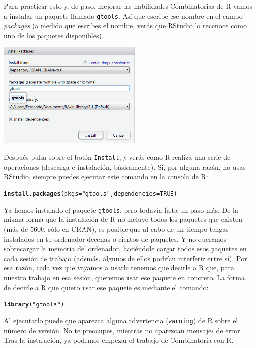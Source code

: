 \documentclass[10pt,a4paper]{article}\usepackage[]{graphicx}\usepackage[]{color}
\makeatletter
\newcommand{\hlnum}[1]{\textcolor[rgb]{0.686,0.059,0.569}{#1}}%
\newcommand{\hlstr}[1]{\textcolor[rgb]{0.192,0.494,0.8}{#1}}%
\newcommand{\hlstd}[1]{\textcolor[rgb]{0.345,0.345,0.345}{#1}}%
\newcommand{\hlkwc}[1]{\textcolor[rgb]{0.333,0.667,0.333}{#1}}%
\newcommand{\hlkwd}[1]{\textcolor[rgb]{0.737,0.353,0.396}{\textbf{#1}}}%
\newenvironment{kframe}{%
 \def\at@end@of@kframe{}%
 \ifinner\ifhmode%
  \def\at@end@of@kframe{\end{minipage}}%
  \begin{minipage}{\columnwidth}%
 \fi\fi%
 \def\FrameCommand##1{\hskip\@totalleftmargin \hskip-\fboxsep
 \colorbox{shadecolor}{##1}\hskip-\fboxsep
     \hskip-\linewidth \hskip-\@totalleftmargin \hskip\columnwidth}%
 \MakeFramed {\advance\hsize-\width
   \@totalleftmargin\z@ \linewidth\hsize
   \@setminipage}}%
 {\par\unskip\endMakeFramed%
 \at@end@of@kframe}
\newenvironment{knitrout}{}{} %
\makeatother
\begin{document}
      Para practicar esto y, de paso, mejorar las habilidades Combinatorias de R vamos a instalar un paquete llamado {\tt gtools}. Así que escribe ese nombre en el campo {\em packages} (a medida que escribes el nombre, verás que RStudio lo reconoce como uno de los  paquetes disponibles).
      \begin{center}
      \includegraphics[width=7cm]{./fig/Tut03-InstalarGtools2.png}
      \end{center}
      Después pulsa sobre el botón {\tt Install}, y verás como R realiza una serie de operaciones (descarga e instalación, básicamente). Si, por alguna razón, no usas RStudio, siempre puedes ejecutar este comando en la consola de R:
\begin{knitrout}
\color{fgcolor}\begin{kframe}
\begin{alltt}
\hlkwd{install.packages}\hlstd{(}\hlkwc{pkgs}\hlstd{=}\hlstr{"gtools"}\hlstd{,}\hlkwc{dependencies}\hlstd{=}\hlnum{TRUE}\hlstd{)}
\end{alltt}
\end{kframe}
\end{knitrout}
           Ya hemos instalado el paquete {\tt gtools}, pero todavía falta un paso más. De la misma forma que la instalación de R no incluye todos los paquetes que existen (más de $5600$, sólo en CRAN), es posible que al cabo de un tiempo tengas instalados en tu ordenador decenas o cientos de paquetes. Y no queremos sobrecargar la memoria del ordenador, haciéndole cargar todos esos paquetes en cada sesión de trabajo (además, algunos de ellos podrían interferir entre sí). Por esa razón, cada vez que vayamos a usarlo tenemos que decirle a R que, para nuestro trabajo en esa sesión, queremos usar ese paquete en concreto. La forma de decirle a R que quiero usar ese paquete es mediante el comando:
\begin{knitrout}
\color{fgcolor}\begin{kframe}
\begin{alltt}
\hlkwd{library}\hlstd{(}\hlstr{"gtools"}\hlstd{)}
\end{alltt}
\end{kframe}
\end{knitrout}
           Al ejecutarlo puede que aparezca alguna advertencia ({\tt warning}) de R sobre el número de versión. No te preocupes, mientras no aparezcan mensajes de error. Tras la instalación, ya podemos empezar el trabajo de Combinatoria con R.
      
\end{document}
